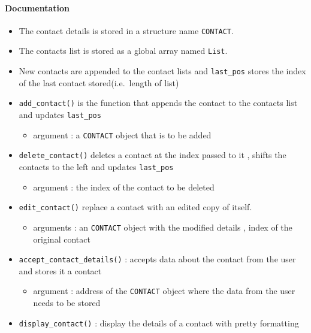 \documentclass[
]{article}
\providecommand{\tightlist}{%
  \setlength{\itemsep}{0pt}\setlength{\parskip}{0pt}}
\begin{document}
\hypertarget{documentation-for-simple-contacts-code}{%
\paragraph{Documentation}\label{documentation-for-simple-contacts-code}}

\begin{itemize}
\tightlist
\item
  The contact details is stored in a structure name \texttt{CONTACT}.
\item
  The contacts list is stored as a global array named \texttt{List}.
\item
  New contacts are appended to the contact lists and \texttt{last\_pos}
  stores the index of the last contact stored(i.e.~length of list)
\item
  \texttt{add\_contact()} is the function that appends the contact to
  the contacts list and updates \texttt{last\_pos}

  \begin{itemize}
  \tightlist
  \item
    argument : a \texttt{CONTACT} object that is to be added
  \end{itemize}
\item
  \texttt{delete\_contact()} deletes a contact at the index passed to it
  , shifts the contacts to the left and updates \texttt{last\_pos}

  \begin{itemize}
  \tightlist
  \item
    argument : the index of the contact to be deleted
  \end{itemize}
\item
  \texttt{edit\_contact()} replace a contact with an edited copy of
  itself.

  \begin{itemize}
  \tightlist
  \item
    arguments : an \texttt{CONTACT} object with the modified details ,
    index of the original contact
  \end{itemize}
\item
  \texttt{accept\_contact\_details()} : accepts data about the contact
  from the user and stores it a contact

  \begin{itemize}
  \tightlist
  \item
    argument : address of the \texttt{CONTACT} object where the data
    from the user needs to be stored
  \end{itemize}
\item
  \texttt{display\_contact()} : display the details of a contact with
  pretty formatting


\end{itemize}
\end{document}
